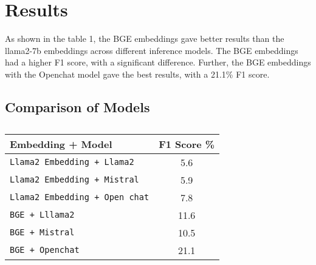 \documentclass[11pt]{article}
\begin{document}




\section{Results}

As shown in the table 1, the BGE embeddings gave better results than the llama2-7b embeddings across different inference models. The BGE embeddings had a higher F1 score, with a significant difference.
Further, the BGE embeddings with the Openchat model gave the best results, with a 21.1\% F1 score. 
\subsection{Comparison of Models}
\begin{table}
\centering
\begin{tabular}{lc}
\hline
\textbf{Embedding + Model} & \textbf{F1 Score \%}\\
\hline
\verb|Llama2 Embedding + Llama2| &  {5.6} \\
\verb|Llama2 Embedding + Mistral| & {5.9} \\
\verb|Llama2 Embedding + Open chat| & {7.8} \\ 
\verb|BGE + Lllama2| & {11.6} \\ 
\verb|BGE + Mistral| & {10.5} \\
\verb|BGE + Openchat| & {21.1}  \\ 
\hline
\end{tabular}
\caption{}
\label{tab:accents}
\end{table}
\end{document}
